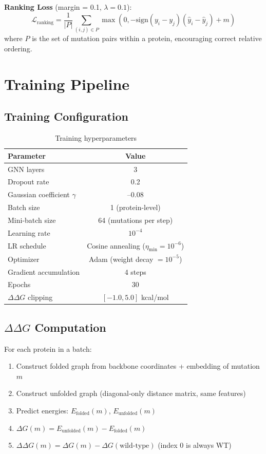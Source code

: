 \textbf{Ranking Loss} (margin = 0.1, $\lambda = 0.1$):
\begin{equation}
    \mathcal{L}_{\text{ranking}} = \frac{1}{|P|} \sum_{(i,j) \in P} \max(0, -\text{sign}(y_i - y_j)(\hat{y}_i - \hat{y}_j) + m)
\end{equation}
where $P$ is the set of mutation pairs within a protein, encouraging correct relative ordering.

\section{Training Pipeline}

\subsection{Training Configuration}

\begin{table}[h]
\centering
\caption{Training hyperparameters}
\label{tab:hyperparams}
\begin{tabular}{lc}
\toprule
\textbf{Parameter} & \textbf{Value} \\
\midrule
GNN layers & 3 \\
Dropout rate & 0.2 \\
Gaussian coefficient $\gamma$ & --0.08 \\
Batch size & 1 (protein-level) \\
Mini-batch size & 64 (mutations per step) \\
Learning rate & $10^{-4}$ \\
LR schedule & Cosine annealing ($\eta_{\min} = 10^{-6}$) \\
Optimizer & Adam (weight decay $= 10^{-5}$) \\
Gradient accumulation & 4 steps \\
Epochs & 30 \\
$\Delta\Delta G$ clipping & $[-1.0, 5.0]$ kcal/mol \\
\bottomrule
\end{tabular}
\end{table}

\subsection{$\Delta\Delta G$ Computation}

For each protein in a batch:
\begin{enumerate}
    \item Construct folded graph from backbone coordinates + embedding of mutation $m$
    \item Construct unfolded graph (diagonal-only distance matrix, same features)
    \item Predict energies: $E_{\text{folded}}(m)$, $E_{\text{unfolded}}(m)$
    \item $\Delta G(m) = E_{\text{unfolded}}(m) - E_{\text{folded}}(m)$
    \item $\Delta\Delta G(m) = \Delta G(m) - \Delta G(\text{wild-type})$ (index 0 is always WT)
\end{enumerate}

